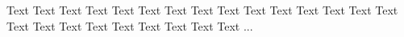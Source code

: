 \section*{\centering {}}
Text Text Text Text Text Text Text Text Text Text Text Text Text Text Text Text Text Text Text Text Text Text Text Text ...
\newpage
